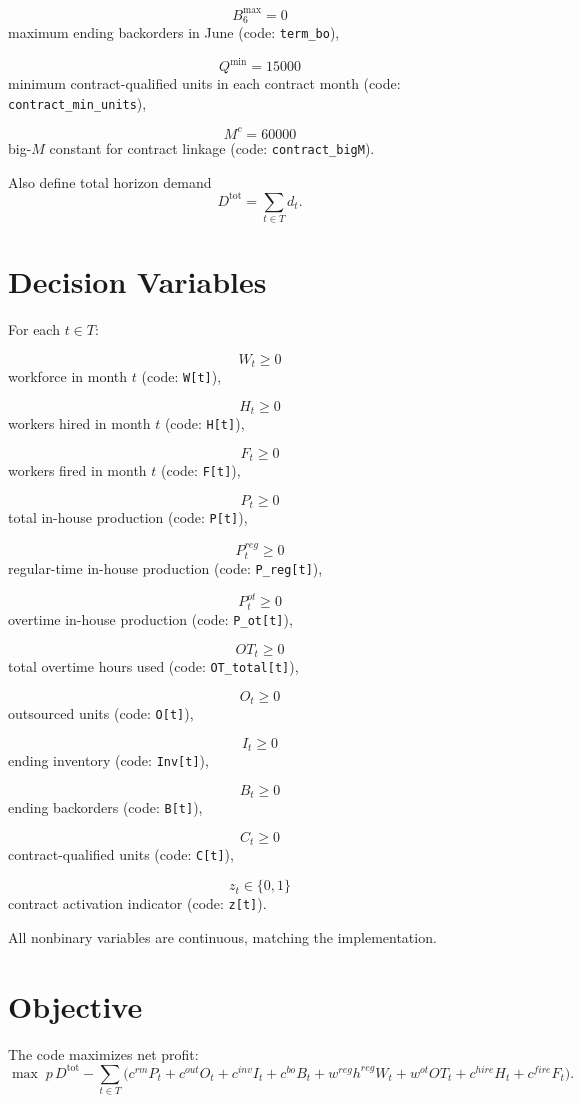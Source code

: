 \[
B^{\max}_{6}=0
\]
maximum ending backorders in June (code: \texttt{term\_bo}),

\[
Q^{\min}=15000
\]
minimum contract-qualified units in each contract month (code: \texttt{contract\_min\_units}),

\[
M^{c}=60000
\]
big-\(M\) constant for contract linkage (code: \texttt{contract\_bigM}).

Also define total horizon demand
\[
D^{\mathrm{tot}}=\sum_{t\in T} d_t.
\]

\section*{Decision Variables}

For each \(t\in T\):

\[
W_t \ge 0
\]
workforce in month \(t\) (code: \texttt{W[t]}),

\[
H_t \ge 0
\]
workers hired in month \(t\) (code: \texttt{H[t]}),

\[
F_t \ge 0
\]
workers fired in month \(t\) (code: \texttt{F[t]}),

\[
P_t \ge 0
\]
total in-house production (code: \texttt{P[t]}),

\[
P^{reg}_t \ge 0
\]
regular-time in-house production (code: \texttt{P\_reg[t]}),

\[
P^{ot}_t \ge 0
\]
overtime in-house production (code: \texttt{P\_ot[t]}),

\[
OT_t \ge 0
\]
total overtime hours used (code: \texttt{OT\_total[t]}),

\[
O_t \ge 0
\]
outsourced units (code: \texttt{O[t]}),

\[
I_t \ge 0
\]
ending inventory (code: \texttt{Inv[t]}),

\[
B_t \ge 0
\]
ending backorders (code: \texttt{B[t]}),

\[
C_t \ge 0
\]
contract-qualified units (code: \texttt{C[t]}),

\[
z_t \in \{0,1\}
\]
contract activation indicator (code: \texttt{z[t]}).

All nonbinary variables are continuous, matching the implementation.

\section*{Objective}

The code maximizes net profit:
\[
\max \; p\,D^{\mathrm{tot}}
-\sum_{t\in T}\Big(
c^{rm} P_t
+c^{out} O_t
+c^{inv} I_t
+c^{bo} B_t
+w^{reg} h^{reg} W_t
+w^{ot} OT_t
+c^{hire} H_t
+c^{fire} F_t
\Big).
\]


